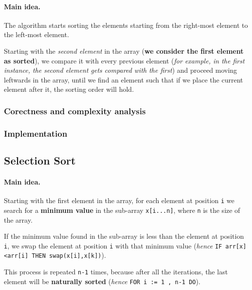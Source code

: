 \documentclass[a4paper]{article}
\begin{document}
                \paragraph{Main idea.}
                The algorithm starts sorting the elements starting 
                from the right-most element to the left-most element.

                Starting with the \textit{second 
                element} in the array (\textbf{we consider
                the first element as sorted}), we
                compare it with every previous element
                (\textit{for example, in the first instance, the second element gets
                compared with the first}) and
                proceed moving leftwards in the array, until we
                find an element such that if we place the current element
                after it, the sorting order will hold.
                \subsubsection*{Corectness and complexity analysis}
                \subsubsection*{Implementation}
            
            \subsection{Selection Sort}
                \paragraph{Main idea.}
                Starting with the first element in the array, for each element at position
                \verb|i| we search for a \textbf{minimum value} in the sub-array
                \verb|x[i...n]|, where \verb|n| is the size of the array.

                If the minimum value found in the sub-array is less than the
                element at position \verb|i|, we swap the element at position \verb|i|
                with that minimum value
                (\textit{hence} \verb|IF arr[x]<arr[i] THEN swap(x[i],x[k])|).

                This process is repeated \verb|n-1| times, because after all
                the iterations, the last element will be \textbf{naturally sorted}
                (\textit{hence} \verb|FOR i := 1 , n-1 DO|).
\end{document}
